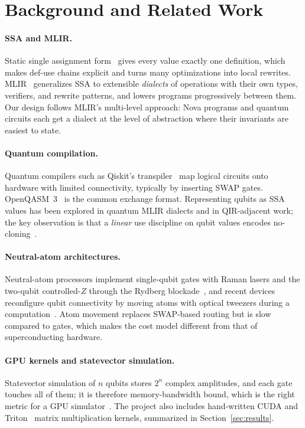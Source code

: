 \documentclass[11pt]{article}
\begin{document}
\section{Background and Related Work}

\paragraph{SSA and MLIR.} Static single assignment form~\cite{cytron1991} gives every value exactly one definition,
which makes def-use chains explicit and turns many optimizations into local rewrites. MLIR~\cite{mlir} generalizes
SSA to extensible \emph{dialects} of operations with their own types, verifiers, and rewrite patterns, and lowers
programs progressively between them. Our design follows MLIR's multi-level approach: Nova programs and quantum
circuits each get a dialect at the level of abstraction where their invariants are easiest to state.

\paragraph{Quantum compilation.} Quantum compilers such as Qiskit's transpiler~\cite{qiskit} map logical circuits
onto hardware with limited connectivity, typically by inserting SWAP gates. OpenQASM~3~\cite{openqasm3} is the
common exchange format. Representing qubits as SSA values has been explored in quantum MLIR dialects and in
QIR-adjacent work; the key observation is that a \emph{linear} use discipline on qubit values encodes
no-cloning~\cite{wootters1982}.

\paragraph{Neutral-atom architectures.} Neutral-atom processors implement single-qubit gates with Raman lasers and
the two-qubit controlled-$Z$ through the Rydberg blockade~\cite{saffman2010}, and recent devices reconfigure qubit
connectivity by moving atoms with optical tweezers during a computation~\cite{bluvstein2022,bluvstein2024}. Atom
movement replaces SWAP-based routing but is slow compared to gates, which makes the cost model different from that
of superconducting hardware.

\paragraph{GPU kernels and statevector simulation.} Statevector simulation of $n$ qubits stores $2^n$ complex
amplitudes, and each gate touches all of them; it is therefore memory-bandwidth bound, which is the right metric for
a GPU simulator~\cite{cuquantum}. The project also includes hand-written CUDA and Triton~\cite{triton} matrix
multiplication kernels, summarized in Section~\ref{sec:results}.
\end{document}
